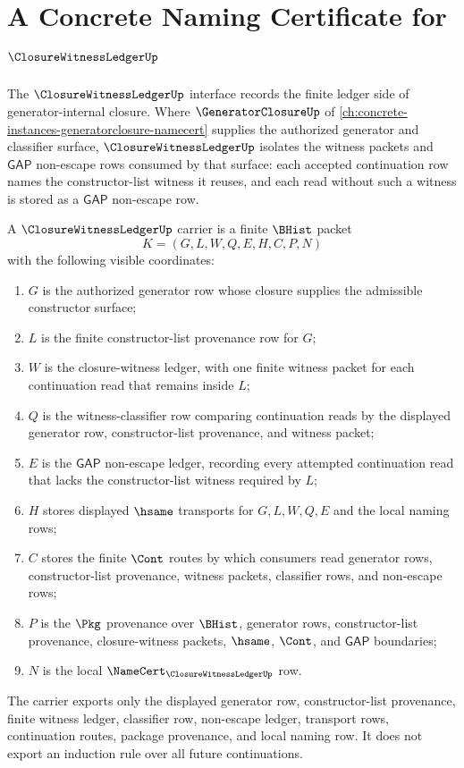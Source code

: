 \chapter{A Concrete Naming Certificate for $\ClosureWitnessLedgerUp$}
\label{ch:concrete-instances-closurewitnessledger-namecert}

The $\ClosureWitnessLedgerUp$ interface records the finite ledger side of generator-internal closure. Where $\GeneratorClosureUp$ of \autoref{ch:concrete-instances-generatorclosure-namecert} supplies the authorized generator and classifier surface, $\ClosureWitnessLedgerUp$ isolates the witness packets and $\mathsf{GAP}$ non-escape rows consumed by that surface: each accepted continuation row names the constructor-list witness it reuses, and each read without such a witness is stored as a $\mathsf{GAP}$ non-escape row.

\begin{definition}
\label{def:closure-witness-ledger-carrier}
A $\ClosureWitnessLedgerUp$ carrier is a finite $\BHist$ packet
$$
K=(G,L,W,Q,E,H,C,P,N)
$$
with the following visible coordinates:
\begin{enumerate}
\item $G$ is the authorized generator row whose closure supplies the admissible constructor surface;
\item $L$ is the finite constructor-list provenance row for $G$;
\item $W$ is the closure-witness ledger, with one finite witness packet for each continuation read that remains inside $L$;
\item $Q$ is the witness-classifier row comparing continuation reads by the displayed generator row, constructor-list provenance, and witness packet;
\item $E$ is the $\mathsf{GAP}$ non-escape ledger, recording every attempted continuation read that lacks the constructor-list witness required by $L$;
\item $H$ stores displayed $\hsame$ transports for $G,L,W,Q,E$ and the local naming rows;
\item $C$ stores the finite $\Cont$ routes by which consumers read generator rows, constructor-list provenance, witness packets, classifier rows, and non-escape rows;
\item $P$ is the $\Pkg$ provenance over $\BHist$, generator rows, constructor-list provenance, closure-witness packets, $\hsame$, $\Cont$, and $\mathsf{GAP}$ boundaries;
\item $N$ is the local $\NameCert_{\ClosureWitnessLedgerUp}$ row.
\end{enumerate}
The carrier exports only the displayed generator row, constructor-list provenance, finite witness ledger, classifier row, non-escape ledger, transport rows, continuation routes, package provenance, and local naming row. It does not export an induction rule over all future continuations.
\end{definition}

